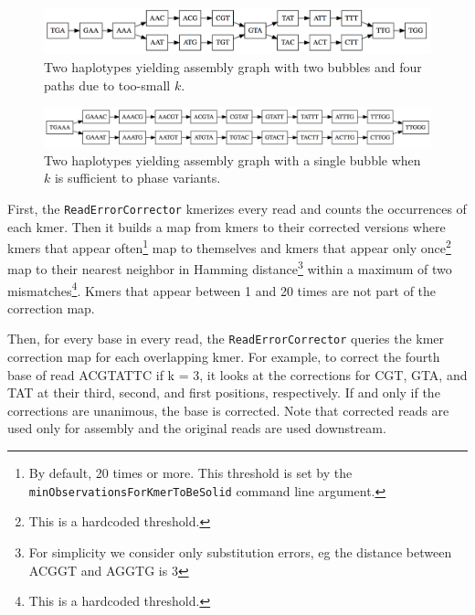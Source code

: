 \documentclass[nofootinbib,amssymb,amsmath]{revtex4}
\newcommand{\code}[1]{\texttt{#1}}
\begin{document}
\begin{figure}
\center
\includegraphics[scale=0.5]{unphased_graph.png}
\caption{Two haplotypes yielding assembly graph with two bubbles and four paths due to too-small $k$.}
\label{fig:unphased}
\end{figure}

\begin{figure}
\center
\includegraphics[scale=0.5]{phased_graph.png}
\caption{Two haplotypes yielding assembly graph with a single bubble when $k$ is sufficient to phase variants.}
\label{fig:phased}
\end{figure}

First, the \code{ReadErrorCorrector} kmerizes every read and counts the occurrences of each kmer.  Then it builds a map from kmers to their corrected versions where kmers that appear often\footnote{By default, 20 times or more.  This threshold is set by the \code{minObservationsForKmerToBeSolid} command line argument.} map to themselves and kmers that appear only once\footnote{This is a hardcoded threshold.} map to their nearest neighbor in Hamming distance\footnote{For simplicity we consider only substitution errors, eg the distance between ACGGT and AGGTG is 3} within a maximum of two mismatches\footnote{This is a hardcoded threshold.}.  Kmers that appear between 1 and 20 times are not part of the correction map.

Then, for every base in every read, the \code{ReadErrorCorrector} queries the kmer correction map for each overlapping kmer.  For example, to correct the fourth base of read ACGTATTC if k = 3, it looks at the corrections for CGT, GTA, and TAT at their third, second, and first positions, respectively.  If and only if the corrections are unanimous, the base is corrected.  Note that corrected reads are used only for assembly and the original reads are used downstream.
\end{document}
